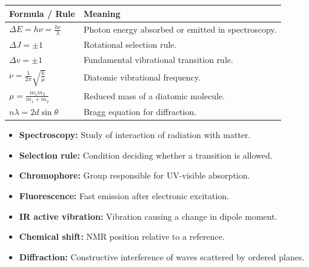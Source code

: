 \documentclass[12pt,a4paper]{article}
\begin{document}
\begin{tcolorbox}[formulabox, title={Key Formulas at a Glance}]
\begin{tabularx}{\linewidth}{|B{4.0cm}|Y|}
\hline
\textbf{Formula / Rule} & \textbf{Meaning} \\
\hline
$\Delta E=h\nu=\displaystyle\frac{hc}{\lambda}$ & Photon energy absorbed or emitted in spectroscopy. \\
\hline
$\Delta J=\pm1$ & Rotational selection rule. \\
\hline
$\Delta v=\pm1$ & Fundamental vibrational transition rule. \\
\hline
$\nu=\displaystyle\frac{1}{2\pi}\sqrt{\displaystyle\frac{k}{\mu}}$ & Diatomic vibrational frequency. \\
\hline
$\mu=\displaystyle\frac{m_1m_2}{m_1+m_2}$ & Reduced mass of a diatomic molecule. \\
\hline
$n\lambda=2d\sin\theta$ & Bragg equation for diffraction. \\
\hline
\end{tabularx}
\end{tcolorbox}

\begin{tcolorbox}[defbox, title={One-Line Definitions}]
\begin{itemize}[leftmargin=*, itemsep=2pt, topsep=2pt]
  \item \textbf{Spectroscopy:} Study of interaction of radiation with matter.
  \item \textbf{Selection rule:} Condition deciding whether a transition is allowed.
  \item \textbf{Chromophore:} Group responsible for UV-visible absorption.
  \item \textbf{Fluorescence:} Fast emission after electronic excitation.
  \item \textbf{IR active vibration:} Vibration causing a change in dipole moment.
  \item \textbf{Chemical shift:} NMR position relative to a reference.
  \item \textbf{Diffraction:} Constructive interference of waves scattered by ordered planes.
\end{itemize}
\end{tcolorbox}
\end{document}
